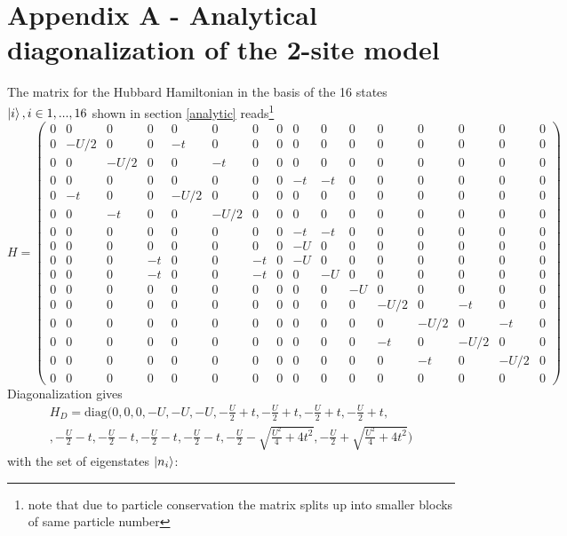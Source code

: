 \section{Appendix A - Analytical diagonalization of the 2-site model}
The matrix for the Hubbard Hamiltonian in the basis of the 16 states $\ket{i}, i\in {1,...,16}$ shown in section \ref{analytic} reads\footnote{note that due to particle conservation the matrix splits up into smaller blocks of same particle number}
\begin{equation*}
	H=
\begin{pmatrix}
	0&0&0&0&0&0&0&0&0&0&0&0&0&0&0&0\\
	0&-U/2&0&0&-t&0&0&0&0&0&0&0&0&0&0&0\\
	0&0&-U/2&0&0&-t&0&0&0&0&0&0&0&0&0&0\\
	0&0&0&0&0&0&0&0&-t&-t&0&0&0&0&0&0\\
	0&-t&0&0&-U/2&0&0&0&0&0&0&0&0&0&0&0\\
	0&0&-t&0&0&-U/2&0&0&0&0&0&0&0&0&0&0\\
	0&0&0&0&0&0&0&0&-t&-t&0&0&0&0&0&0\\
	0&0&0&0&0&0&0&0&-U&0&0&0&0&0&0&0\\
	0&0&0&-t&0&0&-t&0&-U&0&0&0&0&0&0&0\\
	0&0&0&-t&0&0&-t&0&0&-U&0&0&0&0&0&0\\
	0&0&0&0&0&0&0&0&0&0&-U&0&0&0&0&0\\
	0&0&0&0&0&0&0&0&0&0&0&-U/2&0&-t&0&0\\
	0&0&0&0&0&0&0&0&0&0&0&0&-U/2&0&-t&0\\
	0&0&0&0&0&0&0&0&0&0&0&-t&0&-U/2&0&0\\
	0&0&0&0&0&0&0&0&0&0&0&0&-t&0&-U/2&0\\
	0&0&0&0&0&0&0&0&0&0&0&0&0&0&0&0
\end{pmatrix}
\end{equation*}
Diagonalization gives 
\begin{align*}
	H_D= \text{diag}\biggl(0,0,0,-U,-U,-U, -\frac{U}{2}+t, -\frac{U}{2}+t,-\frac{U}{2}+t,-\frac{U}{2}+t,\\,-\frac{U}{2}-t,-\frac{U}{2}-t,-\frac{U}{2}-t,-\frac{U}{2}-t,-\frac{U}{2}-\sqrt{\frac{U^2}{4}+4t^2},-\frac{U}{2}+\sqrt{\frac{U^2}{4}+4t^2}\biggr)
\end{align*}
with the set of eigenstates $\ket{n_i}$:

